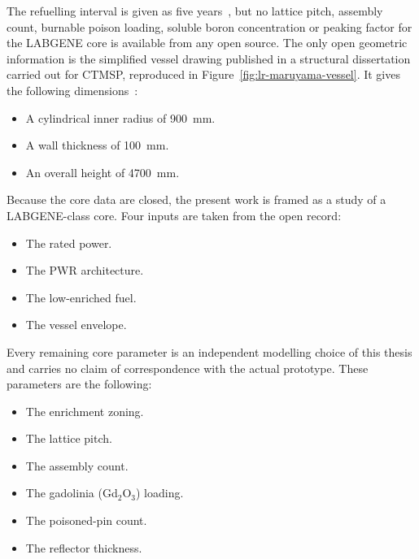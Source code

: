 The refuelling interval is given as five years~\cite{dinizcosta_2017},
but no lattice pitch, assembly count, burnable poison loading, soluble
boron concentration or peaking factor for the LABGENE core is available
from any open source. The only open geometric information is the simplified
vessel drawing published in a structural dissertation carried out for
CTMSP, reproduced in Figure~\ref{fig:lr-maruyama-vessel}. It gives the
following dimensions~\cite{maruyama_2013}:

\begin{itemize}
  \item A cylindrical inner radius of 900~mm.

  \item A wall thickness of 100~mm.

  \item An overall height of 4700~mm.
\end{itemize}

Because the core data are closed, the present work is framed as a study
of a LABGENE-class core. Four inputs are taken from the open record:

\begin{itemize}
  \item The rated power.

  \item The PWR architecture.

  \item The low-enriched fuel.

  \item The vessel envelope.
\end{itemize}

Every remaining core parameter is an independent modelling choice of
this thesis and carries no claim of correspondence with the actual
prototype. These parameters are the following:

\begin{itemize}
  \item The enrichment zoning.

  \item The lattice pitch.

  \item The assembly count.

  \item The gadolinia (Gd$_2$O$_3$) loading.

  \item The poisoned-pin count.

  \item The reflector thickness.
\end{itemize}

